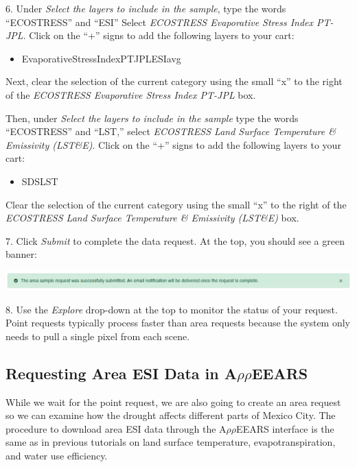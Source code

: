 \documentclass[oneside,a4paper,11pt,explicit]{book}
\begin{document}
\vspace{.5em}

6. Under \textit{Select the layers to include in the sample}, type the words ``ECOSTRESS'' and ``ESI'' Select \textit{ECOSTRESS Evaporative Stress Index PT-JPL}. Click on the ``+'' signs to add the following layers to your cart: 

\begin{itemize}
	\item Evaporative\textunderscore Stress\textunderscore Index\textunderscore PT\textunderscore JPL\textunderscore ESIavg
\end{itemize}

Next, clear the selection of the current category using the small ``x'' to the right of the \textit{ECOSTRESS Evaporative Stress Index PT-JPL} box.

Then, under \textit{Select the layers to include in the sample} type the words ``ECOSTRESS'' and ``LST,'' select \textit{ECOSTRESS Land Surface Temperature \& Emissivity (LST\&E)}. Click on the ``+'' signs to add the following layers to your cart: 

\begin{itemize}
	\item SDS\textunderscore LST
\end{itemize}

Clear the selection of the current category using the small ``x'' to the right of the \textit{ECOSTRESS Land Surface Temperature \& Emissivity (LST\&E)} box.

7. Click \textit{Submit} to complete the data request. At the top, you should see a green banner:

\vspace{.5em}

\centerline{\includegraphics[width=\textwidth]{RequestSuccess.png}}

8. Use the \textit{Explore} drop-down at the top to monitor the status of your request. Point requests typically process faster than area requests because the system only needs to pull a single pixel from each scene.

\subsection{Requesting Area ESI Data in A$\rho\rho$EEARS}

While we wait for the point request, we are also going to create an area request so we can examine how the drought affects different parts of Mexico City. The procedure to download area ESI data through the A$\rho\rho$EEARS interface is the same as in previous tutorials on land surface temperature, evapotranspiration, and water use efficiency.
\end{document}
